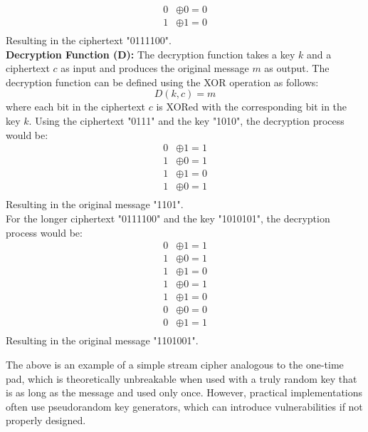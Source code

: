 \documentclass[openany]{book}
\begin{document}
\begin{example}
\begin{align*}
        0 &\oplus 0 = 0 \\
        1 &\oplus 1 = 0 \\
    \end{align*}
    Resulting in the ciphertext "0111100". \\
    \textbf{Decryption Function (D):} The decryption function takes a key \( k \) and a ciphertext \( c \) as input and produces the original message \( m \) as output. The decryption function can be defined using the XOR operation as follows:
    $$ D(k, c) = m $$
    where each bit in the ciphertext \( c \) is XORed with the corresponding bit in the key \( k \). Using the ciphertext "0111" and the key "1010", the decryption process would be:
    \begin{align*}
        0 &\oplus 1 = 1 \\
        1 &\oplus 0 = 1 \\
        1 &\oplus 1 = 0 \\
        1 &\oplus 0 = 1 \\
    \end{align*}
    Resulting in the original message "1101". \\
    For the longer ciphertext "0111100" and the key "1010101", the decryption process would be:
    \begin{align*}
        0 &\oplus 1 = 1 \\
        1 &\oplus 0 = 1 \\
        1 &\oplus 1 = 0 \\
        1 &\oplus 0 = 1 \\
        1 &\oplus 1 = 0 \\
        0 &\oplus 0 = 0 \\
        0 &\oplus 1 = 1 \\
\end{align*}
Resulting in the original message "1101001". \\
\end{example}
The above is an example of a simple stream cipher analogous to the one-time pad, which is theoretically unbreakable when used with a truly random key that is as long as the message and used only once. However, practical implementations often use pseudorandom key generators, which can introduce vulnerabilities if not properly designed.
\end{document}
